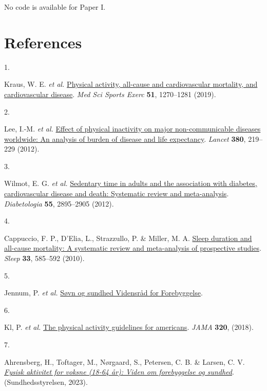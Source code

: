 \documentclass[
  10pt,
]{scrbook}
\newlength{\cslhangindent}
\newlength{\csllabelwidth}
\newlength{\cslentryspacingunit} %
\newenvironment{CSLReferences}[2] %
 {%
  \setlength{\parindent}{0pt}
  \ifodd #1
  \let\oldpar\par
  \def\par{\hangindent=\cslhangindent\oldpar}
  \fi
  \setlength{\parskip}{#2\cslentryspacingunit}
 }%
 {}
\newcommand{\CSLLeftMargin}[1]{\parbox[t]{\csllabelwidth}{#1}}
\newcommand{\CSLRightInline}[1]{\parbox[t]{\linewidth - \csllabelwidth}{#1}\break}
\let\originaltextbf\textbf
\renewcommand{\textbf}[1]{\textcolor{color1}{\textsf{\originaltextbf{#1}}}}
\begin{document}
No code is available for Paper I.

\hypertarget{references}{%
\chapter{References}\label{references}}

\hypertarget{refs}{}
\begin{CSLReferences}{0}{0}
\leavevmode{}%
\CSLLeftMargin{1. }%
\CSLRightInline{Kraus, W. E. \emph{et al.}
\href{https://doi.org/10.1249/MSS.0000000000001939}{Physical activity,
all-cause and cardiovascular mortality, and cardiovascular disease}.
\emph{Med Sci Sports Exerc} \textbf{51}, 1270--1281 (2019).}

\leavevmode{}%
\CSLLeftMargin{2. }%
\CSLRightInline{Lee, I.-M. \emph{et al.}
\href{https://doi.org/10.1016/S0140-6736(12)61031-9}{Effect of physical
inactivity on major non-communicable diseases worldwide: An analysis of
burden of disease and life expectancy}. \emph{Lancet} \textbf{380},
219--229 (2012).}

\leavevmode{}%
\CSLLeftMargin{3. }%
\CSLRightInline{Wilmot, E. G. \emph{et al.}
\href{https://doi.org/10.1007/s00125-012-2677-z}{Sedentary time in
adults and the association with diabetes, cardiovascular disease and
death: Systematic review and meta-analysis}. \emph{Diabetologia}
\textbf{55}, 2895--2905 (2012).}

\leavevmode{}%
\CSLLeftMargin{4. }%
\CSLRightInline{Cappuccio, F. P., D'Elia, L., Strazzullo, P. \& Miller,
M. A. \href{https://doi.org/10.1093/sleep/33.5.585}{Sleep duration and
all-cause mortality: A systematic review and meta-analysis of
prospective studies}. \emph{Sleep} \textbf{33}, 585--592 (2010).}

\leavevmode{}%
\CSLLeftMargin{5. }%
\CSLRightInline{Jennum, P. \emph{et al.}
\href{https://vidensraad.dk/rapport/soevn-og-sundhed}{Søvn og sundhed
\textbar{} Vidensråd for Forebyggelse}.}

\leavevmode{}%
\CSLLeftMargin{6. }%
\CSLRightInline{Kl, P. \emph{et al.}
\href{https://doi.org/10.1001/jama.2018.14854}{The physical activity
guidelines for americans}. \emph{{JAMA}} \textbf{320}, (2018).}

\leavevmode{}%
\CSLLeftMargin{7. }%
\CSLRightInline{Ahrensberg, H., Toftager, M., Nørgaard, S., Petersen, C.
B. \& Larsen, C. V. \emph{\href{https://www.sst.dk}{Fysisk aktivitet for
voksne (18-64 år): Viden om forebyggelse og sundhed}}.
(Sundhedsstyrelsen, 2023).}


\end{CSLReferences}
\end{document}
